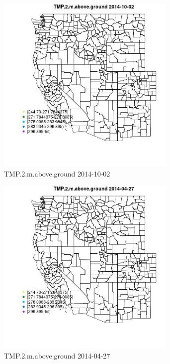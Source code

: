 \begin{figure} 
\centering  
\includegraphics[width=0.77\textwidth]{Code_Outputs/Report_ML_input_PM25_Step4_part_e_de_duplicated_aveswNAs_MapObsTMP2maboveground2014-10-02.jpg} 
\caption{\label{fig:Report_ML_input_PM25_Step4_part_e_de_duplicated_aveswNAsMapObsTMP2maboveground2014-10-02}TMP.2.m.above.ground 2014-10-02} 
\end{figure} 
 

\begin{figure} 
\centering  
\includegraphics[width=0.77\textwidth]{Code_Outputs/Report_ML_input_PM25_Step4_part_e_de_duplicated_aveswNAs_MapObsTMP2maboveground2014-04-27.jpg} 
\caption{\label{fig:Report_ML_input_PM25_Step4_part_e_de_duplicated_aveswNAsMapObsTMP2maboveground2014-04-27}TMP.2.m.above.ground 2014-04-27} 
\end{figure} 
 

